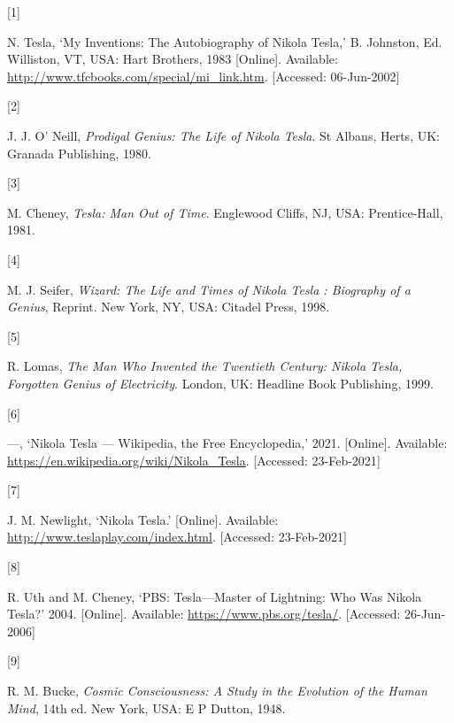 \documentclass[
  12pt,
  british,
  a4paper,
]{article}
\newlength{\cslhangindent}
\newlength{\csllabelwidth}
\newenvironment{CSLReferences}[2] %
 {%
  \setlength{\parindent}{0pt}
  \ifodd #1 \everypar{\setlength{\hangindent}{\cslhangindent}}\ignorespaces\fi
  \ifnum #2 > 0
  \setlength{\parskip}{#2\baselineskip}
  \fi
 }%
 {}
\newcommand{\CSLLeftMargin}[1]{\parbox[t]{\csllabelwidth}{#1}}
\newcommand{\CSLRightInline}[1]{\parbox[t]{\linewidth - \csllabelwidth}{#1}\break}
\begin{document}
\hypertarget{refs}{}
\begin{CSLReferences}{0}{0}
\leavevmode{}%
\CSLLeftMargin{{[}1{]} }
\CSLRightInline{N. Tesla, {`{My Inventions: The Autobiography of Nikola
Tesla},'} B. Johnston, Ed. Williston, VT, USA: Hart Brothers, 1983
{[}Online{]}. Available:
\url{http://www.tfcbooks.com/special/mi_link.htm}. {[}Accessed:
06-Jun-2002{]}}

\leavevmode{}%
\CSLLeftMargin{{[}2{]} }
\CSLRightInline{J. J. O' Neill, \emph{{Prodigal Genius: The Life of
Nikola Tesla}}. St Albans, Herts, UK: Granada Publishing, 1980. }

\leavevmode{}%
\CSLLeftMargin{{[}3{]} }
\CSLRightInline{M. Cheney, \emph{{Tesla: Man Out of Time}}. Englewood
Cliffs, NJ, USA: Prentice-Hall, 1981. }

\leavevmode{}%
\CSLLeftMargin{{[}4{]} }
\CSLRightInline{M. J. Seifer, \emph{{Wizard: The Life and Times of
Nikola Tesla : Biography of a Genius}}, Reprint. New York, NY, USA:
Citadel Press, 1998. }

\leavevmode{}%
\CSLLeftMargin{{[}5{]} }
\CSLRightInline{R. Lomas, \emph{{The Man Who Invented the Twentieth
Century: Nikola Tesla, Forgotten Genius of Electricity}}. London, UK:
Headline Book Publishing, 1999. }

\leavevmode{}%
\CSLLeftMargin{{[}6{]} }
\CSLRightInline{---, {`{N}ikola {T}esla --- {Wikipedia}{,} the {F}ree
{E}ncyclopedia,'} 2021. {[}Online{]}. Available:
\url{https://en.wikipedia.org/wiki/Nikola_Tesla}. {[}Accessed:
23-Feb-2021{]}}

\leavevmode{}%
\CSLLeftMargin{{[}7{]} }
\CSLRightInline{J. M. Newlight, {`{Nikola Tesla}.'} {[}Online{]}.
Available: \url{http://www.teslaplay.com/index.html}. {[}Accessed:
23-Feb-2021{]}}

\leavevmode{}%
\CSLLeftMargin{{[}8{]} }
\CSLRightInline{R. Uth and M. Cheney, {`{PBS: Tesla---Master of
Lightning: Who Was Nikola Tesla?}'} 2004. {[}Online{]}. Available:
\url{https://www.pbs.org/tesla/}. {[}Accessed: 26-Jun-2006{]}}

\leavevmode{}%
\CSLLeftMargin{{[}9{]} }
\CSLRightInline{R. M. Bucke, \emph{{Cosmic Consciousness: A Study in the
Evolution of the Human Mind}}, 14th ed. New York, USA: E P Dutton, 1948.
}


\end{CSLReferences}
\end{document}
